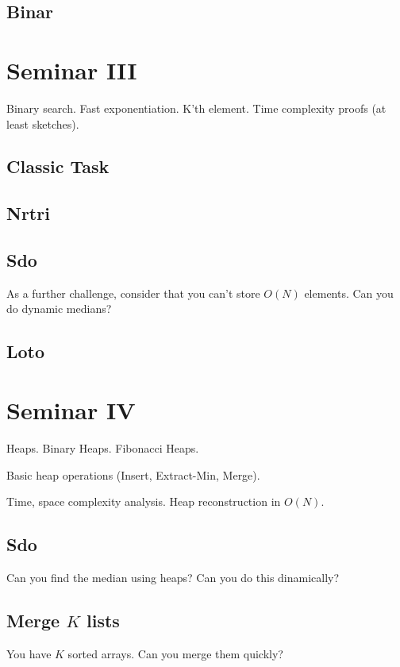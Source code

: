 \documentclass{llncs}
\begin{document}
\subsection{Binar \cite{website:infoarena/binar}}


\section{Seminar III}

Binary search. Fast exponentiation. K'th element. Time complexity proofs (at least sketches).

\subsection{Classic Task \cite{website:infoarena/classictask}}
\subsection{Nrtri \cite{website:infoarena/nrtri}}
\subsection{Sdo \cite{website:infoarena/sdo}}
	As a further challenge, consider that you can't store $O(N)$ elements. Can you do dynamic medians?
\subsection{Loto \cite{website:infoarena/loto}}

\section{Seminar IV}

Heaps. Binary Heaps. Fibonacci Heaps.

Basic heap operations (Insert, Extract-Min, Merge).

Time, space complexity analysis.
Heap reconstruction in $O(N)$.

\subsection{Sdo \cite{website:infoarena/sdo}}
Can you find the median using heaps? Can you do this dinamically?

\subsection{Merge $K$ lists \cite{website:leetcode/merge}}
You have $K$ sorted arrays. Can you merge them quickly?
\end{document}
